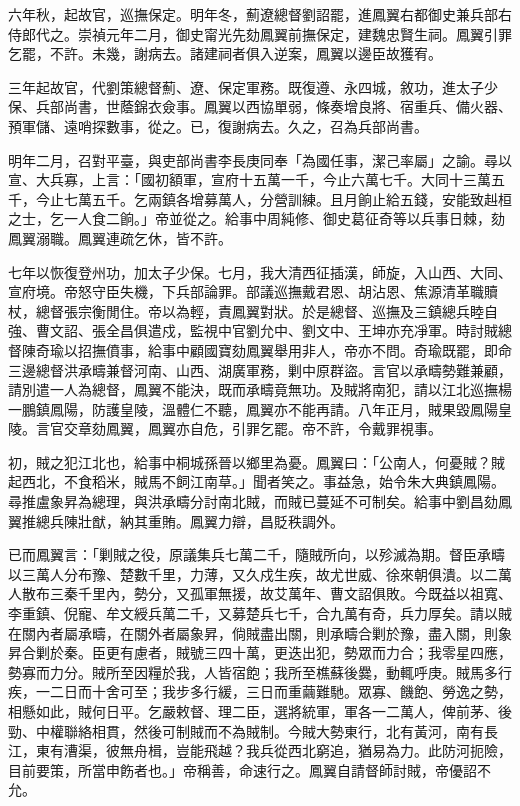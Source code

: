\begin{pinyinscope}
六年秋，起故官，巡撫保定。明年冬，薊遼總督劉詔罷，進鳳翼右都御史兼兵部右侍郎代之。崇禎元年二月，御史甯光先劾鳳翼前撫保定，建魏忠賢生祠。鳳翼引罪乞罷，不許。未幾，謝病去。諸建祠者俱入逆案，鳳翼以邊臣故獲宥。

三年起故官，代劉策總督薊、遼、保定軍務。既復遵、永四城，敘功，進太子少保、兵部尚書，世蔭錦衣僉事。鳳翼以西協單弱，條奏增良將、宿重兵、備火器、預軍儲、遠哨探數事，從之。已，復謝病去。久之，召為兵部尚書。

明年二月，召對平臺，與吏部尚書李長庚同奉「為國任事，潔己率屬」之諭。尋以宣、大兵寡，上言：「國初額軍，宣府十五萬一千，今止六萬七千。大同十三萬五千，今止七萬五千。乞兩鎮各增募萬人，分營訓練。且月餉止給五錢，安能致赳桓之士，乞一人食二餉。」帝並從之。給事中周純修、御史葛征奇等以兵事日棘，劾鳳翼溺職。鳳翼連疏乞休，皆不許。

七年以恢復登州功，加太子少保。七月，我大清西征插漢，師旋，入山西、大同、宣府境。帝怒守臣失機，下兵部論罪。部議巡撫戴君恩、胡沾恩、焦源清革職贖杖，總督張宗衡閒住。帝以為輕，責鳳翼對狀。於是總督、巡撫及三鎮總兵睦自強、曹文詔、張全昌俱遣戍，監視中官劉允中、劉文中、王坤亦充凈軍。時討賊總督陳奇瑜以招撫僨事，給事中顧國寶劾鳳翼舉用非人，帝亦不問。奇瑜既罷，即命三邊總督洪承疇兼督河南、山西、湖廣軍務，剿中原群盜。言官以承疇勢難兼顧，請別遣一人為總督，鳳翼不能決，既而承疇竟無功。及賊將南犯，請以江北巡撫楊一鵬鎮鳳陽，防護皇陵，溫體仁不聽，鳳翼亦不能再請。八年正月，賊果毀鳳陽皇陵。言官交章劾鳳翼，鳳翼亦自危，引罪乞罷。帝不許，令戴罪視事。

初，賊之犯江北也，給事中桐城孫晉以鄉里為憂。鳳翼曰：「公南人，何憂賊？賊起西北，不食稻米，賊馬不飼江南草。」聞者笑之。事益急，始令朱大典鎮鳳陽。尋推盧象昇為總理，與洪承疇分討南北賊，而賊已蔓延不可制矣。給事中劉昌劾鳳翼推總兵陳壯猷，納其重賄。鳳翼力辯，昌貶秩調外。

已而鳳翼言：「剿賊之役，原議集兵七萬二千，隨賊所向，以殄滅為期。督臣承疇以三萬人分布豫、楚數千里，力薄，又久戍生疾，故尤世威、徐來朝俱潰。以二萬人散布三秦千里內，勢分，又孤軍無援，故艾萬年、曹文詔俱敗。今既益以祖寬、李重鎮、倪寵、牟文綬兵萬二千，又募楚兵七千，合九萬有奇，兵力厚矣。請以賊在關內者屬承疇，在關外者屬象昇，倘賊盡出關，則承疇合剿於豫，盡入關，則象昇合剿於秦。臣更有慮者，賊號三四十萬，更迭出犯，勢眾而力合；我零星四應，勢寡而力分。賊所至因糧於我，人皆宿飽；我所至樵蘇後爨，動輒呼庚。賊馬多行疾，一二日而十舍可至；我步多行緩，三日而重繭難馳。眾寡、饑飽、勞逸之勢，相懸如此，賊何日平。乞嚴敕督、理二臣，選將統軍，軍各一二萬人，俾前茅、後勁、中權聯絡相貫，然後可制賊而不為賊制。今賊大勢東行，北有黃河，南有長江，東有漕渠，彼無舟楫，豈能飛越？我兵從西北窮追，猶易為力。此防河扼險，目前要策，所當申飭者也。」帝稱善，命速行之。鳳翼自請督師討賊，帝優詔不允。


\end{pinyinscope}
